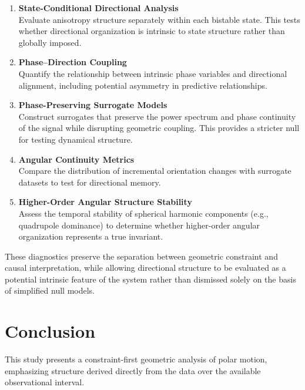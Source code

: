 \documentclass[twocolumn,9pt]{revtex4-2}
\begin{document}
\begin{enumerate}
    \item \textbf{State-Conditional Directional Analysis} \\
    Evaluate anisotropy structure separately within each bistable state. This tests whether
    directional organization is intrinsic to state structure rather than globally imposed.

    \item \textbf{Phase--Direction Coupling} \\
    Quantify the relationship between intrinsic phase variables and directional alignment,
    including potential asymmetry in predictive relationships.

    \item \textbf{Phase-Preserving Surrogate Models} \\
    Construct surrogates that preserve the power spectrum and phase continuity of the signal while
    disrupting geometric coupling. This provides a stricter null for testing dynamical structure.

    \item \textbf{Angular Continuity Metrics} \\
    Compare the distribution of incremental orientation changes with surrogate datasets to test for
    directional memory.

    \item \textbf{Higher-Order Angular Structure Stability} \\
    Assess the temporal stability of spherical harmonic components (e.g., quadrupole dominance) to
    determine whether higher-order angular organization represents a true invariant.
\end{enumerate}

These diagnostics preserve the separation between geometric constraint and causal interpretation,
while allowing directional structure to be evaluated as a potential intrinsic feature of the system
rather than dismissed solely on the basis of simplified null models.

\section{Conclusion}
\label{sec:conclusion}

This study presents a constraint-first geometric analysis
of polar motion, emphasizing structure derived directly
from the data over the available observational interval.
\end{document}
